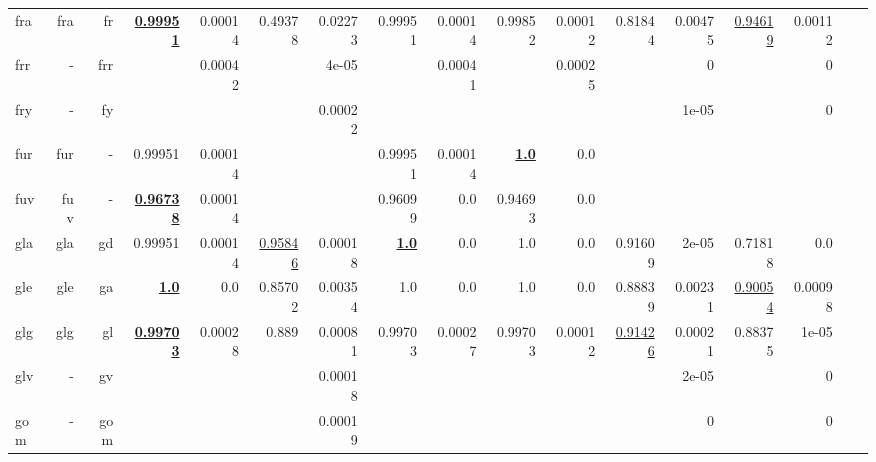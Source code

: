 \documentclass[11pt]{article}
\begin{document}
\begin{table*}[h]
{\begin{tabular}{lrrrrrrrrrrrrrrrr}
fra         & fra         & fr         & \textbf{\underline{0.99951}}         & 0.00014         & 0.49378         & 0.02273         & 0.99951         & 0.00014         & 0.99852         & 0.00012         & 0.81844         & 0.00475         & \underline{0.94619}         & 0.00112         \\
frr         & -         & frr         &          & 0.00042         &          & 4e-05         &          & 0.00041         &          & 0.00025         &          & 0         &          & 0         \\
fry         & -         & fy         &          &          &          & 0.00022         &          &          &          &          &          & 1e-05         &          & 0         \\
fur         & fur         & -         & 0.99951         & 0.00014         &          &          & 0.99951         & 0.00014         & \textbf{\underline{1.0}}         & 0.0         &          &          &          &          \\
fuv         & fuv         & -         & \textbf{\underline{0.96738}}         & 0.00014         &          &          & 0.96099         & 0.0         & 0.94693         & 0.0         &          &          &          &          \\
gla         & gla         & gd         & 0.99951         & 0.00014         & \underline{0.95846}         & 0.00018         & \textbf{\underline{1.0}}         & 0.0         & 1.0         & 0.0         & 0.91609         & 2e-05         & 0.71818         & 0.0         \\
gle         & gle         & ga         & \textbf{\underline{1.0}}         & 0.0         & 0.85702         & 0.00354         & 1.0         & 0.0         & 1.0         & 0.0         & 0.88839         & 0.00231         & \underline{0.90054}         & 0.00098         \\
glg         & glg         & gl         & \textbf{\underline{0.99703}}         & 0.00028         & 0.889         & 0.00081         & 0.99703         & 0.00027         & 0.99703         & 0.00012         & \underline{0.91426}         & 0.00021         & 0.88375         & 1e-05         \\
glv         & -         & gv         &          &          &          & 0.00018         &          &          &          &          &          & 2e-05         &          & 0         \\
gom         & -         & gom         &          &          &          & 0.00019         &          &          &          &          &          & 0         &          & 0         \\

\end{tabular}}
\end{table*}
\end{document}
